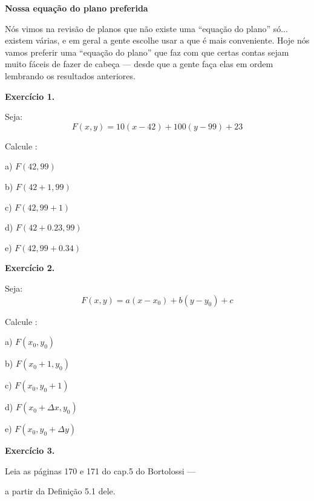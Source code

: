 \documentclass[oneside,12pt]{article}
\begin{document}
\newpage

{\bf Nossa equação do plano preferida}

Nós vimos na revisão de planos que não existe uma ``equação do plano''
só... existem várias, e em geral a gente escolhe usar a que é mais
conveniente. Hoje nós vamos preferir uma ``equação do plano'' que faz
com que certas contas sejam muito fáceis de fazer de cabeça --- desde
que a gente faça elas em ordem lembrando os resultados anteriores.

\newpage


{\bf Exercício 1.}

Seja:
%
$$F(x,y) = 10(x-42) + 100(y-99) + 23$$

Calcule :

a) $F(42, 99)$

b) $F(42 + 1, 99)$

c) $F(42, 99 + 1)$

d) $F(42 + 0.23, 99)$

e) $F(42, 99 + 0.34)$

\newpage


{\bf Exercício 2.}

\ssk

Seja:
%
$$F(x,y) = a(x-x_0) + b(y-y_0) + c$$

Calcule :

\ssk

a) $F(x_0, y_0)$

b) $F(x_0 + 1, y_0)$

c) $F(x_0, y_0 + 1)$

d) $F(x_0 + Δx, y_0)$

e) $F(x_0, y_0 + Δy)$


\newpage


{\bf Exercício 3.}

\ssk

Leia as páginas 170 e 171 do cap.5 do Bortolossi ---

a partir da Definição 5.1 dele.

\msk

\end{document}
